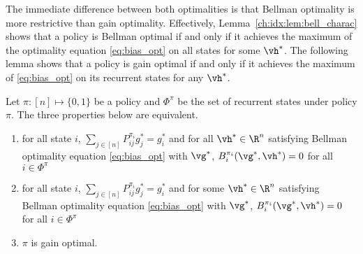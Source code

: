 The immediate difference between both optimalities is that Bellman optimality is more restrictive than gain optimality.
Effectively, Lemma~\ref{ch:idx:lem:bell_charac} shows that a policy is Bellman optimal if and only if it achieves the maximum of the optimality equation \eqref{eq:bias_opt} on all states for some $\vh^*$.
The following lemma shows that a policy is gain optimal if and only if it achieves the maximum of \eqref{eq:bias_opt} on its recurrent states for any $\vh^*$.
\begin{lem}
    \label{ch:idx:lem:opt_pol}
    Let $\pi:[n]\mapsto\{0,1\}$ be a policy and $\Phi^\pi$ be the set of recurrent states under policy $\pi$.
    The three properties below are equivalent.
    \begin{enumerate}[label=(\roman*)]
        \item \label{it:opt_pol1} for all state $i$, $\sum_{j\in[n]}P^{\pi_i}_{ij}g^*_j=g^*_i$ and for all $\vh^*\in \R^{n}$ satisfying Bellman optimality equation \eqref{eq:bias_opt} with $\vg^*$, $B^{\pi_i}_i(\vg^*,\vh^*)=0$ for all $i\in\Phi^\pi$
        \item \label{it:opt_pol2} for all state $i$, $\sum_{j\in[n]}P^{\pi_i}_{ij}g^*_j=g^*_i$ and for some $\vh^*\in \R^{n}$ satisfying Bellman optimality equation \eqref{eq:bias_opt} with $\vg^*$, $B^{\pi_i}_i(\vg^*,\vh^*)=0$ for all $i\in\Phi^\pi$
        \item \label{it:opt_pol3} $\pi$ is gain optimal.
    \end{enumerate}
\end{lem}
